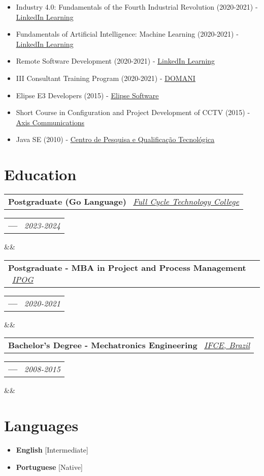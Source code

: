 \documentclass[11pt,a4paper,sans]{moderncv}
\makeatletter
\newcommand*{\customcventry}[7][.13em]{
\begin{tabular}{@{}l}
{\bfseries #4} \
{\itshape #3}
\end{tabular}
\hfill
\begin{tabular}{l@{}}
{\bfseries #5} \
{\itshape #2}
\end{tabular}
\ifx&#7&%
\else{\
\begin{minipage}{\maincolumnwidth}%
\small#7%
\end{minipage}}\fi%
\par\addvspace{#1}}
\makeatother
\begin{document}
{\begin{itemize}[label=\textbullet]
	  \item Industry 4.0: Fundamentals of the Fourth Industrial Revolution (2020-2021) - \underline{\color{blue}\href{https://linkedin.com/learning}{LinkedIn Learning}}
	  \item Fundamentals of Artificial Intelligence: Machine Learning (2020-2021) - \underline{\color{blue}\href{https://linkedin.com/learning}{LinkedIn Learning}}
	  \item Remote Software Development (2020-2021) - \underline{\color{blue}\href{https://linkedin.com/learning}{LinkedIn Learning}}
	  \item III Consultant Training Program (2020-2021) - \underline{\color{blue}\href{https://domani.com.br}{DOMANI}}
	  \item Elipse E3 Developers (2015) - \underline{\color{blue}\href{https://elipse.com}{Elipse Software}}
	  \item Short Course in Configuration and Project Development of CCTV (2015) - \underline{\color{blue}\href{https://axis.com}{Axis Communications}}
	  \item Java SE (2010) - \underline{\color{blue}\href{https://cpqt.com.br}{Centro de Pesquisa e Qualificação Tecnológica}}
  \end{itemize}}

\section{Education}
\customcventry{2023-2024}{{\color{blue}\href{https://fctech.edu.br}{Full Cycle Technology College}}}{Postgraduate (Go Language)}{---}{}{}
\customcventry{2020-2021}{{\color{blue}\href{https://www.ipog.edu.br}{IPOG}}}{Postgraduate - MBA in Project and Process Management}{---}{}{}
\customcventry{2008-2015}{{\color{blue}\href{https://ifce.edu.br}{IFCE, Brazil}}}{Bachelor's Degree - Mechatronics Engineering}{---}{}{}

\section{Languages}
\begin{multicols}{2}
	\begin{itemize}[label=\textbullet]
		\item \textbf{English} [Intermediate]
		\item \textbf{Portuguese} [Native]
	\end{itemize}
\end{multicols}
\end{document}
